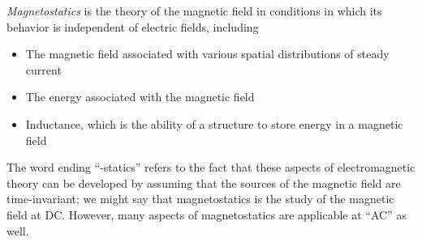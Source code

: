 

\label{m0117_Magnetostatics_Preface} %

\emph{Magnetostatics} is the theory of the magnetic field in conditions in which its behavior is independent of electric fields, including
%
\begin{itemize}
\item The magnetic field associated with various spatial distributions of steady current
\item The energy associated with the magnetic field
\item Inductance, which is the ability of a structure to store energy in a magnetic field
\end{itemize}
%
The word ending ``-statics'' refers to the fact that these aspects of electromagnetic theory can be developed by assuming that the sources of the magnetic field are time-invariant; we might say that magnetostatics is the study of the magnetic field at DC.  However, many aspects of magnetostatics are applicable at ``AC'' as well.
 
